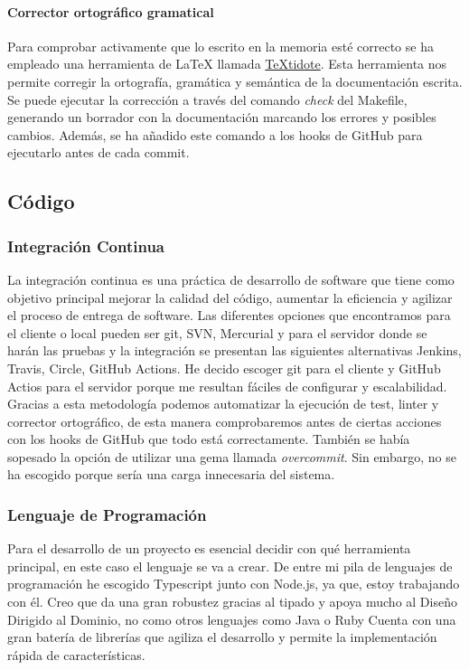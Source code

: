 \paragraph*{Corrector ortográfico gramatical}
Para comprobar activamente que lo escrito en la memoria esté correcto se ha empleado una herramienta de LaTeX llamada \href{https://github.com/sylvainhalle/textidote}{TeXtidote}.
Esta herramienta nos permite corregir la ortografía, gramática y semántica de la documentación escrita. Se puede ejecutar la corrección a través del comando \textit{check} del Makefile,
generando un borrador con la documentación marcando los errores y posibles cambios. Además, se ha añadido este comando a los hooks de GitHub para ejecutarlo antes de cada commit.

\subsection{Código}

\subsubsection*{Integración Continua}
La integración continua es una práctica de desarrollo de software que tiene como objetivo principal mejorar la calidad del código, aumentar la eficiencia y agilizar el proceso de entrega de software.
Las diferentes opciones que encontramos para el cliente o local pueden ser git, SVN, Mercurial y para el servidor donde se harán las pruebas y la integración se presentan las siguientes
alternativas Jenkins, Travis, Circle, GitHub Actions. He decido escoger git para el cliente y GitHub Actios para el servidor porque me resultan fáciles de configurar y escalabilidad.
Gracias a esta metodología podemos automatizar la ejecución de test, linter y corrector ortográfico, de esta manera comprobaremos antes de ciertas acciones con los hooks de GitHub que todo está
correctamente. También se había sopesado la opción de utilizar una gema llamada \textit{overcommit}. Sin embargo, no se ha escogido porque sería una carga innecesaria del sistema.


\subsubsection*{Lenguaje de Programación}
Para el desarrollo de un proyecto es esencial decidir con qué herramienta principal, en este caso el lenguaje se va a crear. De entre mi pila de lenguajes de programación he
escogido Typescript junto con Node.js, ya que, estoy trabajando con él. Creo que da una gran robustez gracias al tipado y apoya mucho al Diseño Dirigido al Dominio, no como otros lenguajes como Java o Ruby
Cuenta con una gran batería de librerías que agiliza el desarrollo y permite la implementación rápida de características.


